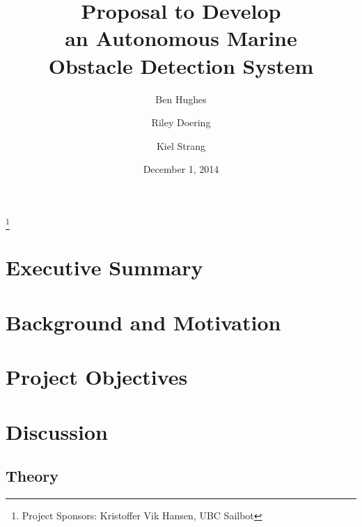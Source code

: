\documentclass[amsmath, amssymb, aps, pra, 12pt]{revtex4-1}
\begin{document}
\title{Proposal to Develop\\an Autonomous Marine\\Obstacle Detection System}
\author{Ben Hughes}
\thanks{Project Sponsors: Kristoffer Vik Hansen, UBC Sailbot}
\author{Riley Doering}
\author{Kiel Strang}
\date{December 1, 2014}
\maketitle


\section*{Executive Summary}


\newpage
\tableofcontents

\makeatletter
\let\toc@pre\relax
\let\toc@post\relax
\makeatother 

\newpage
\listoffigures
\listoftables

\clearpage
\newpage
{}


\section{\label{sec:intro}Background and Motivation}


\section{\label{sec:objectives}Project Objectives}


\section{\label{sec:discussion}Discussion}

\subsection{\label{sec:theory}Theory}

\end{document}
